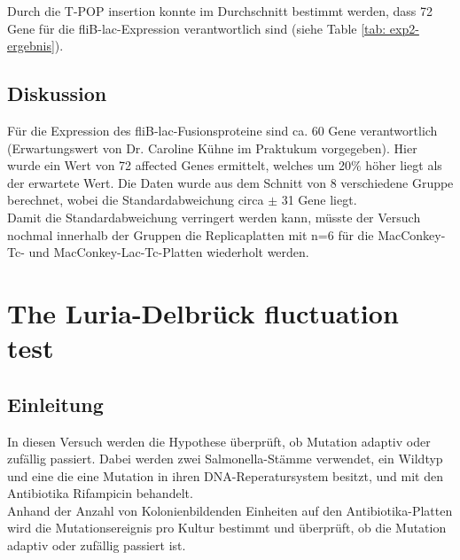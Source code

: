 \documentclass[oneside,10pt,a4paper]{report}
\begin{document}
		Durch die T-POP insertion konnte im Durchschnitt bestimmt werden, dass 72 Gene für die fliB-lac-Expression verantwortlich sind (siehe Table \ref{tab: exp2-ergebnis}).
		\section{Diskussion}
		Für die Expression des fliB-lac-Fusionsproteine sind ca. 60 Gene verantwortlich (Erwartungswert von Dr. Caroline Kühne im Praktukum vorgegeben). Hier wurde ein Wert von 72 affected Genes ermittelt, welches um 20$\%$ höher liegt als der erwartete Wert. Die Daten wurde aus dem Schnitt von 8 verschiedene Gruppe berechnet, wobei die Standardabweichung circa $\pm$ 31 Gene liegt.\\
		Damit die Standardabweichung verringert werden kann, müsste der Versuch nochmal  innerhalb der Gruppen die Replicaplatten mit n=6 für die MacConkey-Tc- und MacConkey-Lac-Tc-Platten wiederholt werden.
		
		

	
	\chapter{The Luria-Delbrück fluctuation test}	
		\section{Einleitung}
		In diesen Versuch werden die Hypothese überprüft, ob Mutation adaptiv oder zufällig passiert.
		Dabei werden zwei Salmonella-Stämme verwendet, ein Wildtyp und eine die eine Mutation in ihren DNA-Reperatursystem besitzt, und mit den Antibiotika Rifampicin behandelt. \\
		Anhand der Anzahl von Kolonienbildenden Einheiten auf den Antibiotika-Platten wird die Mutationsereignis pro Kultur bestimmt und überprüft, ob die Mutation adaptiv oder zufällig passiert ist.
		
		
\end{document}
